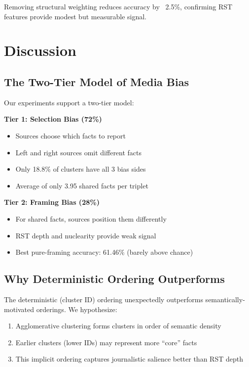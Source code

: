 \documentclass[11pt]{article}
\begin{document}
Removing structural weighting reduces accuracy by ~2.5\%, confirming RST features provide modest but measurable signal.

\section{Discussion}

\subsection{The Two-Tier Model of Media Bias}

Our experiments support a two-tier model:

\textbf{Tier 1: Selection Bias (72\%)}
\begin{itemize}
    \item Sources choose which facts to report
    \item Left and right sources omit different facts
    \item Only 18.8\% of clusters have all 3 bias sides
    \item Average of only 3.95 shared facts per triplet
\end{itemize}

\textbf{Tier 2: Framing Bias (28\%)}
\begin{itemize}
    \item For shared facts, sources position them differently
    \item RST depth and nuclearity provide weak signal
    \item Best pure-framing accuracy: 61.46\% (barely above chance)
\end{itemize}

\subsection{Why Deterministic Ordering Outperforms}

The deterministic (cluster ID) ordering unexpectedly outperforms semantically-motivated orderings. We hypothesize:
\begin{enumerate}
    \item Agglomerative clustering forms clusters in order of semantic density
    \item Earlier clusters (lower IDs) may represent more ``core'' facts
    \item This implicit ordering captures journalistic salience better than RST depth
\end{enumerate}
\end{document}
